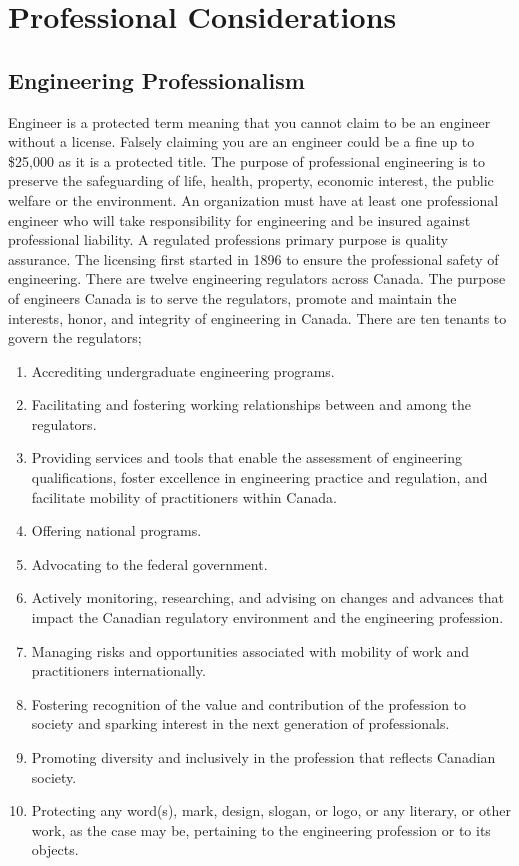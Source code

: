 \documentclass[12pt,a4paper]{report}
\begin{document}
\newpage
\section{Professional Considerations}


\subsection{Engineering Professionalism}

    Engineer is a protected term meaning that you cannot claim to be an engineer without a license. Falsely claiming you are an engineer could be a fine up to \$25,000 as it is a protected title. The purpose of professional engineering is to preserve the safeguarding of life, health, property, economic interest, the public welfare or the environment. An organization must have at least one professional engineer who will take responsibility for engineering and be insured against professional liability. A regulated professions primary purpose is quality assurance. The licensing first started in 1896 to ensure the professional safety of engineering. There are twelve engineering regulators across Canada. The purpose of engineers Canada is to serve the regulators, promote and maintain the interests, honor, and integrity of engineering in Canada. There are ten tenants to govern the regulators; 
    
    \begin{enumerate}
        \item Accrediting undergraduate engineering programs.
        \item Facilitating and fostering working relationships between and among the regulators.
        \item Providing services and tools that enable the assessment of engineering qualifications, foster excellence in engineering practice and regulation, and facilitate mobility of practitioners within Canada.
        \item Offering national programs.
        \item Advocating to the federal government.
        \item Actively monitoring, researching, and advising on changes and advances that impact the Canadian regulatory environment and the engineering profession.
        \item Managing risks and opportunities associated with mobility of work and practitioners internationally.
        \item Fostering recognition of the value and contribution of the profession to society and sparking interest in the next generation of professionals.
        \item Promoting diversity and inclusively in the profession that reflects Canadian society.
        \item Protecting any word(s), mark, design, slogan, or logo, or any literary, or other work, as the case may be, pertaining to the engineering profession or to its objects.
    \end{enumerate}
    
\end{document}
